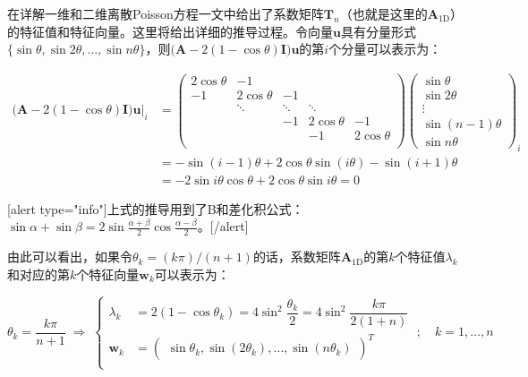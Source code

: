 \documentclass[12pt, UTF8, nofonts]{ctexart}
\begin{document}
在详解一维和二维离散Poisson方程一文中给出了系数矩阵$\boldsymbol{T}_n$（也就是这里的$\boldsymbol{A}_{\mathrm{1D}}$）的特征值和特征向量。这里将给出详细的推导过程。令向量$\boldsymbol{u}$具有分量形式$\{\sin\theta,\sin2\theta,\ldots,\sin n\theta\}$，则$\Big(\boldsymbol{A}-2(1-\cos\theta)\boldsymbol{I}\Big)\boldsymbol{u}$的第$i$个分量可以表示为：

\[
  \begin{aligned}
    \left.\Big(\boldsymbol{A}-2(1-\cos\theta)\boldsymbol{I}\Big)\boldsymbol{u}\right|_i &=
    \begin{pmatrix}
      2\cos\theta & -1 & & & \\
      -1 & 2\cos\theta & -1 & & \\
      & \ddots & \ddots & \ddots & \\
      & & -1 & 2\cos\theta & -1 \\
      & & & -1 & 2\cos\theta \\
    \end{pmatrix}
    \begin{pmatrix}
      \sin\theta \\ \sin 2\theta \\ \vdots \\ \sin(n-1)\theta \\ \sin n\theta
    \end{pmatrix}_i \\
    &= -\sin(i-1)\theta + 2\cos\theta\sin(i\theta) - \sin(i+1)\theta \\
    &= -2\sin i\theta \cos\theta + 2\cos\theta\sin i\theta = 0
  \end{aligned}
\]

[alert type="info"]上式的推导用到了B和差化积公式：$\sin\alpha+\sin\beta=2\sin\frac{\alpha+\beta}{2}\cos\frac{\alpha-\beta}{2}$。[/alert]

由此可以看出，如果令$\theta_k=(k\pi)/(n+1)$的话，系数矩阵$\boldsymbol{A}_{\mathrm{1D}}$的第$k$个特征值$\lambda_{k}$和对应的第$k$个特征向量$\boldsymbol{w}_{k}$可以表示为：

\begin{equation}
  \label{eq:1deigvalvec}
  \theta_k = \dfrac{k\pi}{n+1} \;\Rightarrow\;
  \left\{ \begin{aligned}
    \lambda_k &= 2(1-\cos\theta_k) = 4\sin^2\dfrac{\theta_k}{2} = 4\sin^2\dfrac{k\pi}{2(1+n)} \\
    \boldsymbol{w}_k &=
      \begin{pmatrix}
        \sin\theta_k, \sin(2\theta_k), \ldots, \sin(n\theta_k)
      \end{pmatrix}^T \\
  \end{aligned}\right. \;;\quad k=1,\ldots,n
\end{equation}
\end{document}
